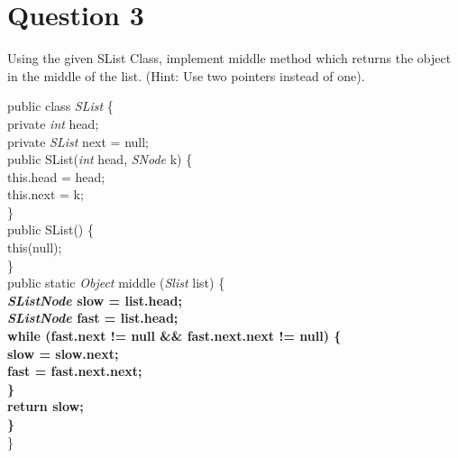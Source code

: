 \documentclass[11 pt, oneside]{article}
\begin{document}
\clearpage

\section*{Question 3}
Using the given SList Class, implement middle method which returns the object in the middle of the list. (Hint: Use two pointers instead of one).

\begin{flushleft}
public class \textit{SList} \{\\
\setlength\parindent{12pt}
private \textit{int} head;\\
private \textit{SList} next = null;\\
\vspace{3mm}
public SList(\textit{int} head, \textit{SNode} k) \{\\
\setlength\parindent{24pt}
this.head = head;\\
this.next = k;\\
\setlength\parindent{12pt}
\}\\
\vspace{3mm}
public SList() \{\\
\setlength\parindent{24pt}
this(null); \\
\setlength\parindent{12pt}
\}\\
\vspace{3mm}
public static \textit{Object} middle (\textit{Slist} list) \{\\
\setlength\parindent{24pt}
\textbf{\textit{SListNode} slow = list.head;\\
\textit{SListNode} fast = list.head;\\
while (fast.next != null \&\& fast.next.next != null) \{\\
\setlength\parindent{36pt}
slow = slow.next;\\
fast = fast.next.next;\\
\setlength\parindent{24pt}
\}\\
return slow;\\
\setlength\parindent{12pt}
\}\\
}
\setlength\parindent{0pt}
\}\\
\end{flushleft}

\clearpage
\end{document}
